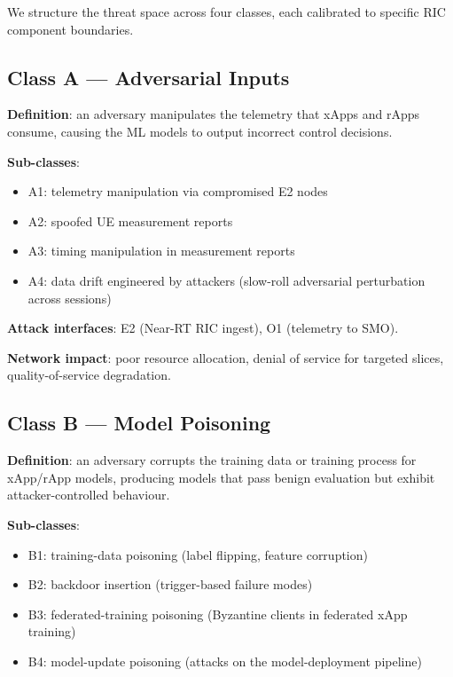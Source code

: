 \documentclass[sigconf,nonacm]{acmart}
\begin{document}
We structure the threat space across four classes, each
calibrated to specific RIC component boundaries.

\subsection{Class A --- Adversarial Inputs}

\textbf{Definition}: an adversary manipulates the telemetry that
xApps and rApps consume, causing the ML models to output
incorrect control decisions.

\textbf{Sub-classes}:
\begin{itemize}
  \item A1: telemetry manipulation via compromised E2 nodes
  \item A2: spoofed UE measurement reports
  \item A3: timing manipulation in measurement reports
  \item A4: data drift engineered by attackers (slow-roll
            adversarial perturbation across sessions)
\end{itemize}

\textbf{Attack interfaces}: E2 (Near-RT RIC ingest), O1 (telemetry
to SMO).

\textbf{Network impact}: poor resource allocation, denial of
service for targeted slices, quality-of-service degradation.

\subsection{Class B --- Model Poisoning}

\textbf{Definition}: an adversary corrupts the training data
or training process for xApp/rApp models, producing models
that pass benign evaluation but exhibit attacker-controlled
behaviour.

\textbf{Sub-classes}:
\begin{itemize}
  \item B1: training-data poisoning (label flipping, feature
            corruption)
  \item B2: backdoor insertion (trigger-based failure modes)
  \item B3: federated-training poisoning (Byzantine clients in
            federated xApp training)
  \item B4: model-update poisoning (attacks on the model-deployment
            pipeline)
\end{itemize}
\end{document}
